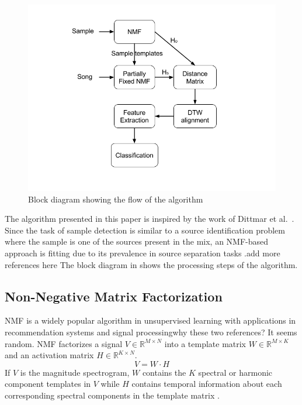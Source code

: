 \documentclass{article}
\begin{document}
\begin{figure}[!ht]
\centering
\includegraphics[width=\linewidth]{block_diagram.png}
\caption{Block diagram showing the flow of the algorithm}
\label{fig_block}
\end{figure}

The algorithm presented in this paper is inspired by the work of Dittmar et al.~\cite{dittmar2012audio}. Since the task of sample detection is similar to a source identification problem where the sample is one of the sources present in the mix, an NMF-based approach is fitting due to its prevalence in source separation tasks \cite{virtanen2007monaural}.{\color{red}add more references here} The block diagram in  shows the processing steps of the algorithm.

\subsection{Non-Negative Matrix Factorization}
NMF is a widely popular algorithm in unsupervised learning with applications in recommendation systems\cite{koren2009matrix} and signal processing\cite{lee1999learning}{\color{red}why these two references? It seems random}. NMF factorizes a signal $V \in \mathbb{R}^{M\times N}$ into a template matrix $W \in \mathbb{R}^{M\times K}$ and an activation matrix $H \in \mathbb{R}^{K\times N}$.
\[ V = W\cdot H\]
If $V$ is the magnitude spectrogram, $W$ contains the $K$ spectral or harmonic component templates in $V$ while $H$ contains temporal information about each corresponding spectral components in the template matrix \cite{smaragdis2003non}.
\end{document}
